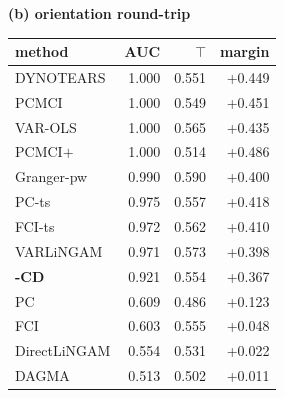 \begin{table}[t]
\begin{minipage}[t]{0.54\columnwidth}
{\raggedright\textbf{(b) orientation round-trip}\par}
\vspace{1pt}
\begin{tabular}{@{}lrrr@{}}
\toprule
method & AUC & $\top$ & margin \\
\midrule
DYNOTEARS & 1.000 & 0.551 & +0.449 \\
PCMCI & 1.000 & 0.549 & +0.451 \\
VAR-OLS & 1.000 & 0.565 & +0.435 \\
PCMCI$+$ & 1.000 & 0.514 & +0.486 \\
Granger-pw & 0.990 & 0.590 & +0.400 \\
PC-ts & 0.975 & 0.557 & +0.418 \\
FCI-ts & 0.972 & 0.562 & +0.410 \\
VARLiNGAM & 0.971 & 0.573 & +0.398 \\
\textbf{\cafe{}-CD} & 0.921 & 0.554 & +0.367 \\
PC & 0.609 & 0.486 & +0.123 \\
FCI & 0.603 & 0.555 & +0.048 \\
DirectLiNGAM & 0.554 & 0.531 & +0.022 \\
DAGMA & 0.513 & 0.502 & +0.011 \\
\bottomrule
\end{tabular}
\end{minipage}
\end{table}
